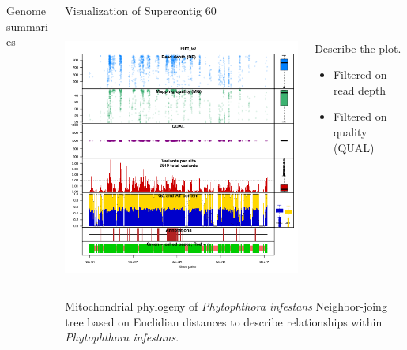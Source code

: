 \documentclass[final,t]{beamer}
\begin{document}
\begin{frame}{}
\begin{columns}[t]
\begin{column}{.28\linewidth}
\begin{block}{Genome summaries}
      \end{block}

    \end{column}

    \begin{column}{.4\linewidth}


      \begin{block}{Visualization of Supercontig 60}
        \begin{columns}[t]
          \begin{column}[T]{0.6\linewidth}
            \includegraphics[width=0.9\linewidth, height=0.7\linewidth]{cplots3.png}
          \end{column}
          \begin{column}[T]{0.4\linewidth}
            Describe the plot.
            \begin{itemize}
              \item Filtered on read depth
              \item Filtered on quality (QUAL)
            \end{itemize}
          \end{column}
        \end{columns}
      \end{block}


      \begin{block}{Mitochondrial phylogeny of \emph{Phytophthora infestans}}
            Neighbor-joing tree based on Euclidian distances to describe relationships within \emph{Phytophthora infestans}.


\end{block}
\end{column}
\end{columns}
\end{frame}
\end{document}
